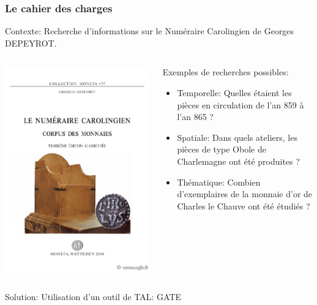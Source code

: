 \documentclass[10pt, compress]{beamer}
\begin{document}
\begin{frame}[fragile]
	\frametitle{Le cahier des charges}
	Contexte: Recherche d'informations sur le Numéraire Carolingien de Georges DEPEYROT.
	\begin{columns}
			\includegraphics[scale=0.2]{img/depeyrot.jpg}
		\onslide<1>
		\begin{scriptsize}
			Exemples de recherches possibles:
			\begin{itemize}
				[square]
				\item{Temporelle: Quelles étaient les pièces en circulation de l’an 859 à l’an 865 ?}
				\item{Spatiale: Dans quels ateliers, les pièces de type Obole de Charlemagne ont été produites ?}
				\item{Thématique: Combien d’exemplaires de la monnaie d’or de Charles le Chauve ont été étudiés ?}
			\end{itemize}	
		\end{scriptsize}
	\end{columns}
	Solution: Utilisation d'un outil de TAL: GATE
\end{frame}
\end{document}
